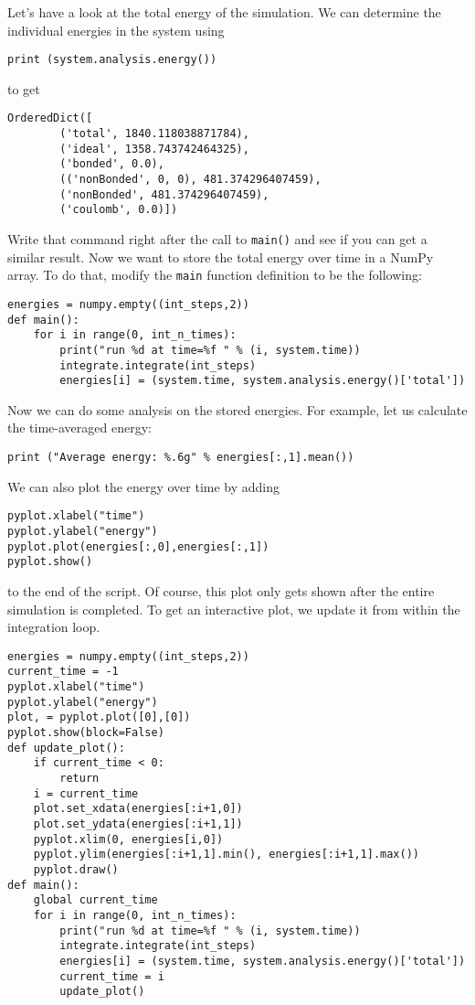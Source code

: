\documentclass[
paper=a4,                       %
fontsize=11pt,                  %
twoside,                        %
footsepline,                    %
headsepline,                    %
headinclude=false,              %
footinclude=false,              %
pagesize,                       %
]{scrartcl}
\begin{document}
Let's have a look at the total energy of the simulation.
We can determine the individual energies in the system using
\begin{lstlisting}
print (system.analysis.energy())
\end{lstlisting}
to get
\begin{lstlisting}
OrderedDict([
        ('total', 1840.118038871784),
        ('ideal', 1358.743742464325),
        ('bonded', 0.0), 
        (('nonBonded', 0, 0), 481.374296407459), 
        ('nonBonded', 481.374296407459), 
        ('coulomb', 0.0)])
\end{lstlisting}
Write that command right after the call to \lstinline{main()} and see if you can get a similar result.
Now we want to store the total energy over time in a NumPy array.
To do that, modify the \lstinline{main} function definition to be the following:
\begin{lstlisting}
energies = numpy.empty((int_steps,2))
def main():
    for i in range(0, int_n_times):
        print("run %d at time=%f " % (i, system.time))
        integrate.integrate(int_steps)
        energies[i] = (system.time, system.analysis.energy()['total'])
\end{lstlisting}
Now we can do some analysis on the stored energies.
For example, let us calculate the time-averaged energy:
\begin{lstlisting}
print ("Average energy: %.6g" % energies[:,1].mean())
\end{lstlisting}
We can also plot the energy over time by adding
\begin{lstlisting}
pyplot.xlabel("time")
pyplot.ylabel("energy")
pyplot.plot(energies[:,0],energies[:,1])
pyplot.show()
\end{lstlisting}
to the end of the script. Of course, this plot only gets shown after the entire simulation is completed.
To get an interactive plot, we update it from within the integration loop.
\begin{lstlisting}
energies = numpy.empty((int_steps,2))
current_time = -1
pyplot.xlabel("time")
pyplot.ylabel("energy")
plot, = pyplot.plot([0],[0])
pyplot.show(block=False)
def update_plot():
    if current_time < 0:
        return
    i = current_time
    plot.set_xdata(energies[:i+1,0])
    plot.set_ydata(energies[:i+1,1])
    pyplot.xlim(0, energies[i,0])
    pyplot.ylim(energies[:i+1,1].min(), energies[:i+1,1].max())
    pyplot.draw()
def main():
    global current_time
    for i in range(0, int_n_times):
        print("run %d at time=%f " % (i, system.time))
        integrate.integrate(int_steps)
        energies[i] = (system.time, system.analysis.energy()['total'])
        current_time = i
        update_plot()
\end{lstlisting}
\end{document}
